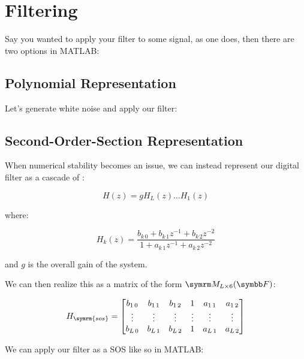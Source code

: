 \documentclass{article}
\begin{document}
\section{Filtering}

Say you wanted to apply your filter to some signal, as one does, then
there are two options in MATLAB:

\subsection{Polynomial Representation}

Let's generate white noise and apply our filter:


\newpage

\subsection{Second-Order-Section Representation}

When numerical stability becomes an issue, we can instead represent our
digital filter as a cascade of :

\begin{equation}
	H(z) = g H_L(z) \dots H_1(z)
\end{equation}

where:

\begin{equation}
	H_k(z)
	=
	\frac
	{b_{k \, 0} + b_{k \, 1} z^{-1} + b_{k \, 2} z^{-2}}
	{1 + a_{k\, 1} z^{-1} + a_{k \, 2} z^{-2}}
\end{equation}

and \(g\) is the overall gain of the system.

We can then realize this as a matrix of the form
\(\matrixField{L}{6}{F}\):

\begin{equation}
	H_{\symrm{sos}}
	=
	\begin{bmatrix}
		b_{1 \, 0}
		&
		b_{1 \, 1}
		&
		b_{1 \, 2}
		&
		1
		&
		a_{1 \, 1}
		&
		a_{1 \, 2}
		\\
		\vdots
		&
		\vdots
		&
		\vdots
		&
		\vdots
		&
		\vdots
		&
		\vdots
		\\
		b_{L \, 0}
		&
		b_{L \, 1}
		&
		b_{L \, 2}
		&
		1
		&
		a_{L \, 1}
		&
		a_{L \, 2}
		\\
	\end{bmatrix}
\end{equation}

We can apply our filter as a SOS like so in MATLAB:

\end{document}
